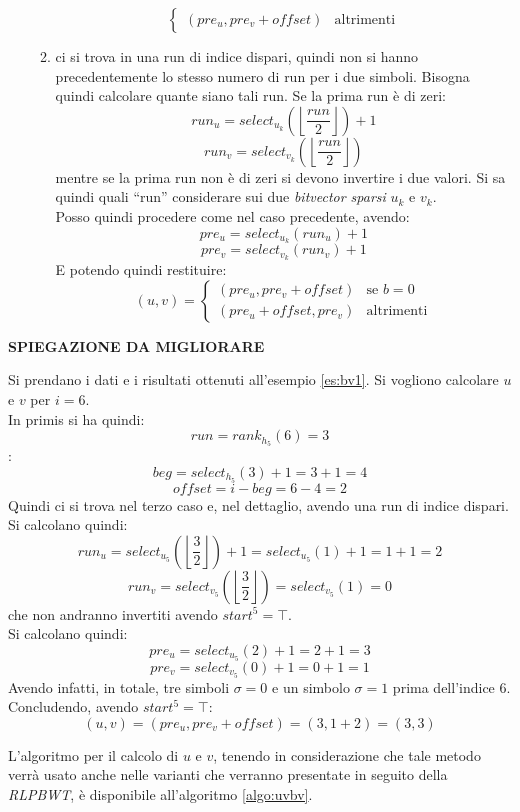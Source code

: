 \begin{enumerate}
\begin{enumerate}
\[\begin{cases}
        (pre_u,pre_v+offset)&\mbox{altrimenti}
      \end{cases}
    \]
    \item ci si trova in una run di indice dispari, quindi non si hanno
    precedentemente lo stesso numero di run per i due simboli. Bisogna quindi
    calcolare quante siano tali run. Se la prima run è di zeri:
    \[run_u=select_{u_k}\left(\left\lfloor\frac{run}{2}\right\rfloor\right)+1\]
    \[run_v=select_{v_k}\left(\left\lfloor\frac{run}{2}\right\rfloor\right)\]
    mentre se la prima run non è di zeri si devono invertire i due valori. Si sa
    quindi quali ``run'' considerare sui due \textit{bitvector sparsi} $u_k$ e
    $v_k$.\\ 
    Posso quindi procedere come nel caso precedente, avendo:
    \[pre_u=select_{u_k}(run_u)+1\]
    \[pre_v=select_{v_k}(run_v)+1\]
    E potendo quindi restituire:
    \[(u,v)=
      \begin{cases}
        (pre_u,pre_v+offset)&\mbox{se } b=0\\
        (pre_u+offset,pre_v)&\mbox{altrimenti}
      \end{cases}
    \]
  \end{enumerate}
\end{enumerate}
\textbf{SPIEGAZIONE DA MIGLIORARE}
\begin{esempio}
  Si prendano i dati e i risultati ottenuti all'esempio \ref{es:bv1}. Si
  vogliono calcolare $u$ e $v$ per $i=6$.\\
  In primis si ha quindi:
  \[run=rank_{h_5}(6)=3\]:
  \[beg = select_{h_5}(3)+1=3+1=4\]
  \[offset = i-beg=6-4=2\]
  Quindi ci si trova nel terzo caso e, nel dettaglio, avendo una run di
  indice dispari. Si calcolano quindi:
  \[run_u=select_{u_5}\left(\left\lfloor\frac{3}{2}\right\rfloor\right)+1=
    select_{u_5}(1)+1
    =1+1=2\] 
  \[run_v=select_{v_5}\left(\left\lfloor\frac{3}{2}\right\rfloor\right)=
    select_{v_5}(1)=0\] 
  che non andranno invertiti avendo $start^5=\top$.\\
  Si calcolano quindi:
  \[pre_u=select_{u_5}(2)+1=2+1=3\]
  \[pre_v=select_{v_5}(0)+1=0+1=1\]
  Avendo infatti, in totale, tre simboli $\sigma=0$ e un simbolo $\sigma=1$
  prima dell'indice 6.\\ 
  Concludendo, avendo $start^5=\top$:
  \[(u,v)=(pre_u, pre_v + offset)=(3,1+2)=(3,3)\]
\end{esempio}
L'algoritmo per il calcolo di $u$ e $v$, tenendo in considerazione che tale
metodo verrà usato anche nelle varianti che verranno presentate in seguito della
\textit{RLPBWT}, è disponibile all'algoritmo \ref{algo:uvbv}.